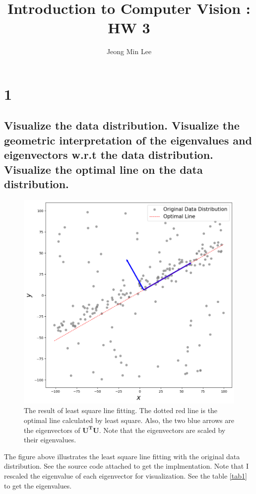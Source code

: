 \documentclass[10pt]{article}
\title{\textbf{Introduction to Computer Vision : HW 3}}
\author{Jeong Min Lee}
\begin{document}
\maketitle
\section*{1}
\subsection*{Visualize the data distribution. Visualize the geometric interpretation of the eigenvalues and eigenvectors w.r.t the data distribution. Visualize the optimal line on the data distribution.}

\begin{figure}[!h]
    \begin{center}
        \includegraphics*[scale = 0.4]{./fig/fig1.png}
    \end{center}
    \caption{The result of least square line fitting. The dotted red line is the optimal line calculated by least square. Also, the two blue arrows are the eigenvectors of $\mathbf{U^TU}$. Note that the eigenvectors are scaled by their eigenvalues. }
\end{figure}

The figure above illustrates the least square line fitting with the original data distribution. 
See the source code attached to get the implmentation. 
Note that I rescaled the eigenvalue of each eigenvector for visualization. See the table \ref{tab1} to get the eigenvalues.
\end{document}
